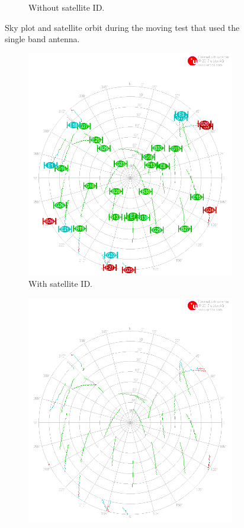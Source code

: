 \documentclass[letterpaper, 10 pt,onecolumn]{article}
\begin{document}
\begin{figure}[b]
\begin{subfigure}{.45\textwidth}
			\caption{	Without satellite ID.}
			\label{fig:mt1_obt}
		\end{subfigure}
		\caption[short]{Sky plot and satellite orbit during the moving test that used the single band antenna.}
		\label{fig:mt1} 
	\end{figure}
	\begin{figure}[tb]
		\centering
		\begin{subfigure}{.5\textwidth}
			\includegraphics[width=0.9\linewidth]{../Moving_DualBand/skyplot.png}
			\caption{	
				With satellite ID.}
			\label{fig:mt2_sky}
		\end{subfigure}%
		\hfill
		\begin{subfigure}{.5\textwidth}
			\includegraphics[width=0.9\linewidth]{../Moving_DualBand/skyplot_orbit.png}

\end{subfigure}
\end{figure}
\end{document}
